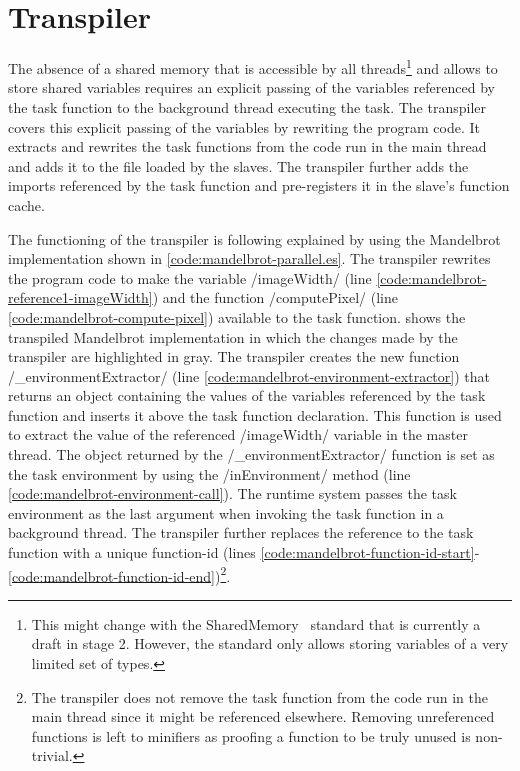 \section{Transpiler}\label{sec:transpiler}
The absence of a shared memory that is accessible by all threads\footnote{This might change with the SharedMemory~\cite{Ecma2016} standard that is currently a draft in stage 2. However, the standard only allows storing variables of a very limited set of types.} and allows to store shared variables requires an explicit passing of the variables referenced by the task function to the background thread executing the task. The transpiler covers this explicit passing of the variables by rewriting the program code. It extracts and rewrites the task functions from the code run in the main thread and adds it to the file loaded by the slaves. The transpiler further adds the imports referenced by the task function and pre-registers it in the slave's function cache. 

The functioning of the transpiler is following explained by using the Mandelbrot implementation shown in \cref{code:mandelbrot-parallel.es}. The transpiler rewrites the program code to make the variable \javascriptinline/imageWidth/ (line \ref{code:mandelbrot-reference1-imageWidth}) and the function \javascriptinline/computePixel/ (line \ref{code:mandelbrot-compute-pixel}) available to the task function.  shows the transpiled Mandelbrot implementation in which the changes made by the transpiler are highlighted in gray. The transpiler creates the new function \javascriptinline/_environmentExtractor/ (line \ref{code:mandelbrot-environment-extractor}) that returns an object containing the values of the variables referenced by the task function and inserts it above the task function declaration. This function is used to extract the value of the referenced \javascriptinline/imageWidth/ variable in the master thread. The object returned by the \javascriptinline/_environmentExtractor/ function is set as the task environment by using the \javascriptinline/inEnvironment/ method (line \ref{code:mandelbrot-environment-call}). The runtime system passes the task environment as the last argument when invoking  the task function in a background thread. The transpiler further replaces the reference to the task function with a unique function-id (lines \ref{code:mandelbrot-function-id-start}-\ref{code:mandelbrot-function-id-end})\footnote{The transpiler does not remove the task function from the code run in the main thread since it might be referenced elsewhere. Removing unreferenced functions is left to minifiers as proofing a function to be truly unused is non-trivial.}. 

